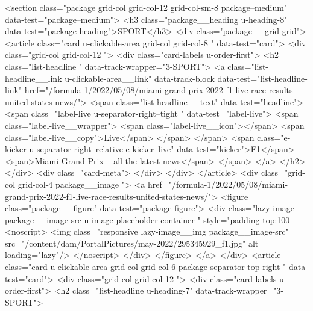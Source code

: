 {{{	
		
			
		
<section class="package grid-col grid-col-12 grid-col-sm-8 package--medium" data-test="package--medium">
<h3 class="package__heading u-heading-8" data-test="package-heading">SPORT</h3>
<div class="package__grid grid">
<article class="card u-clickable-area grid-col grid-col-8  " data-test="card">
<div class="grid-col grid-col-12  ">
<div class="card-labels u-order-first">
<h2 class="list-headline  " data-track-wrapper="3-SPORT">
<a class="list-headline__link u-clickable-area__link" data-track-block data-test="list-headline-link" href="/formula-1/2022/05/08/miami-grand-prix-2022-f1-live-race-results-united-states-news/">
<span class="list-headline__text" data-test="headline">
<span class="label-live  u-separator-right--tight " data-test="label-live">
<span class="label-live__wrapper">
<span class="label-live__icon"></span>
<span class="label-live__copy">Live</span>
</span>
</span>
<span class="e-kicker u-separator-right--relative e-kicker--live" data-test="kicker">F1</span>
<span>Miami Grand Prix – all the latest news</span>
</span>
</a>
</h2>
</div>
<div class="card-meta">
</div>
</div>
</article>
<div class="grid-col grid-col-4 package__image ">
<a href="/formula-1/2022/05/08/miami-grand-prix-2022-f1-live-race-results-united-states-news/">
<figure class="package__figure" data-test="package-figure">
<div class="lazy-image package__image-src u-image-placeholder-container " style="padding-top:100%
<noscript>
<img class="responsive lazy-image__img package__image-src" src="/content/dam/PortalPictures/may-2022/295345929_f1.jpg" alt loading="lazy"/>
</noscript>
</div>
</figure>
</a>
</div>
<article class="card u-clickable-area grid-col grid-col-6 package-separator-top-right " data-test="card">
<div class="grid-col grid-col-12  ">
<div class="card-labels u-order-first">
<h2 class="list-headline  u-heading-7" data-track-wrapper="3-SPORT">
}}}
